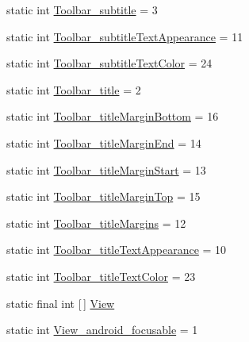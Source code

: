 \begin{DoxyCompactItemize}
\item 
static int \hyperlink{classandroid_1_1support_1_1v7_1_1cardview_1_1R_1_1styleable_a15786fa791e3f7056cf296b7dc084793}{Toolbar\+\_\+subtitle} = 3
\item 
static int \hyperlink{classandroid_1_1support_1_1v7_1_1cardview_1_1R_1_1styleable_aa11a7434ed1156d4cb5332750e4d47d7}{Toolbar\+\_\+subtitle\+Text\+Appearance} = 11
\item 
static int \hyperlink{classandroid_1_1support_1_1v7_1_1cardview_1_1R_1_1styleable_a666ac2e125d2da2c2f5914e8752d53c5}{Toolbar\+\_\+subtitle\+Text\+Color} = 24
\item 
static int \hyperlink{classandroid_1_1support_1_1v7_1_1cardview_1_1R_1_1styleable_a8a1e899ea860ef6abef71ec802396325}{Toolbar\+\_\+title} = 2
\item 
static int \hyperlink{classandroid_1_1support_1_1v7_1_1cardview_1_1R_1_1styleable_ad223c3ae470aaccab0964ae1eab151d8}{Toolbar\+\_\+title\+Margin\+Bottom} = 16
\item 
static int \hyperlink{classandroid_1_1support_1_1v7_1_1cardview_1_1R_1_1styleable_a8f2cddb87416872d939a7d1b70b3756d}{Toolbar\+\_\+title\+Margin\+End} = 14
\item 
static int \hyperlink{classandroid_1_1support_1_1v7_1_1cardview_1_1R_1_1styleable_ab25420371f54701b5a8cf6d7a885519b}{Toolbar\+\_\+title\+Margin\+Start} = 13
\item 
static int \hyperlink{classandroid_1_1support_1_1v7_1_1cardview_1_1R_1_1styleable_ad27fec87a488036b64111605f95749ac}{Toolbar\+\_\+title\+Margin\+Top} = 15
\item 
static int \hyperlink{classandroid_1_1support_1_1v7_1_1cardview_1_1R_1_1styleable_ae38a718516abd89948a47ede4fa58b9f}{Toolbar\+\_\+title\+Margins} = 12
\item 
static int \hyperlink{classandroid_1_1support_1_1v7_1_1cardview_1_1R_1_1styleable_a0550b9c219eb26f50afa2d0709195a54}{Toolbar\+\_\+title\+Text\+Appearance} = 10
\item 
static int \hyperlink{classandroid_1_1support_1_1v7_1_1cardview_1_1R_1_1styleable_a575dc8e25cd7d21b6d8b14cae397fdae}{Toolbar\+\_\+title\+Text\+Color} = 23
\item 
static final int \mbox{[}$\,$\mbox{]} \hyperlink{classandroid_1_1support_1_1v7_1_1cardview_1_1R_1_1styleable_a25c91e78e53c1aa0141b94584e88b486}{View}
\item 
static int \hyperlink{classandroid_1_1support_1_1v7_1_1cardview_1_1R_1_1styleable_adb41a8189c196a759dc62ea614f6ff17}{View\+\_\+android\+\_\+focusable} = 1

\end{DoxyCompactItemize}
